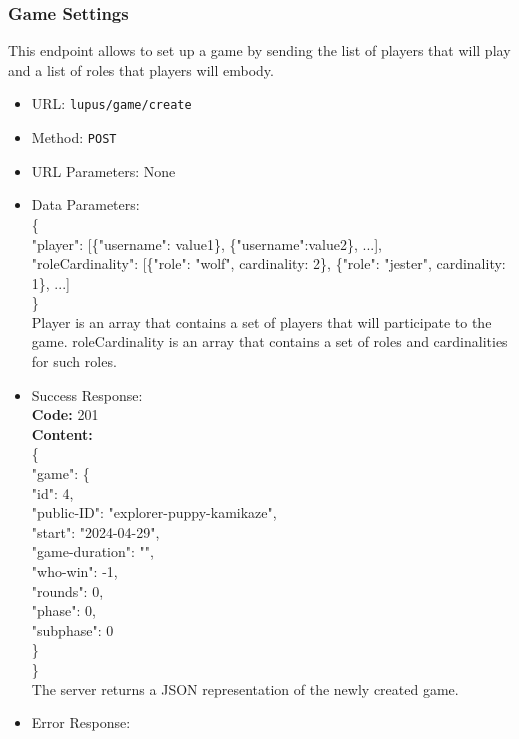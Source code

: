 \subsubsection*{Game Settings}
This endpoint allows to set up a game by sending the list of players that will play and a list of roles that players will embody.

\begin{itemize}
    \item URL: \texttt{lupus/game/create}
    \item Method: \texttt{POST}
    \item URL Parameters: None
    \item Data Parameters:\\
        \{\\
        \tab "player": [\{"username": value1\}, \{"username":value2\}, ...], \\
        \tab "roleCardinality": [\{"role": "wolf", cardinality: 2\}, \{"role": "jester", cardinality: 1\}, ...] \\
        \}\\
        Player is an array that contains a set of players that will participate to the game. roleCardinality is an array that contains a set of roles and cardinalities for such roles.
    \item Success Response: \\
        \textbf{Code:} 201\\
        \textbf{Content:} \\
        \{\\
        \tab  "game": \{ \\
        \tab \tab "id": 4, \\
        \tab \tab "public-ID": "explorer-puppy-kamikaze", \\
        \tab \tab "start": "2024-04-29", \\
        \tab \tab "game-duration": "", \\
        \tab \tab "who-win": -1, \\ 
        \tab \tab "rounds": 0, \\
        \tab \tab "phase": 0, \\
        \tab \tab "subphase": 0 \\
        \tab\}\\
        \} \\
        The server returns a JSON representation of the newly created game.
    \item Error Response:\\

\end{itemize}

